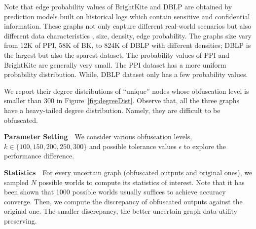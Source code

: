 Note that edge probability values of BrightKite and DBLP are obtained by prediction models built on historical logs which contain sensitive and confidential information. 
These graphs not only capture different real-world scenarios but also different data characteristics {\eg}, size, density, edge probability. 
The graphs size vary from 12K of PPI,  58K of BK, to 824K of DBLP with different densities; 
DBLP is the largest but also the sparest dataset.  
The probability values of PPI and BrightKite are generally very small. 
The PPI dataset has a more uniform probability distribution. While, DBLP dataset only has a few probability values.

We report their degree distributions of “unique” nodes whose obfuscation level is smaller than 300 in Figure~\ref{fig:degreeDist}. Observe that, all the three graphs have a heavy-tailed degree distribution. Namely, they are difficult to be obfuscated.

\textbf{Parameter Setting}~~We consider various obfuscation levels, $k \in \{100,150,200,250,300\}$ and possible tolerance values $\epsilon$ to explore the performance difference. 

\textbf{Statistics}~~For every uncertain graph (obfuscated outputs and original ones), we sampled $N$ possible worlds to compute its statistics of interest. Note that it has been shown that 1000 possible worlds usually suffices to achieve accuracy converge.  Then, we compute the discrepancy of obfuscated outputs against the original one. The smaller discrepancy, the better uncertain graph data utility preserving.


